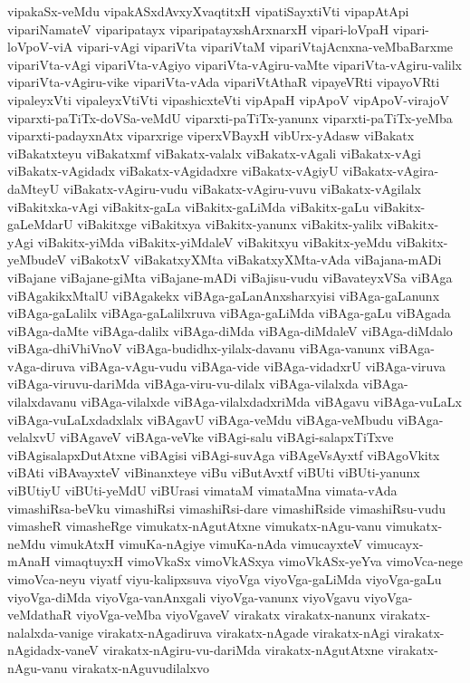 {vipakaSx-veMdu
vipakASxdAvxyXvaqtitxH
vipatiSayxtiVti
vipapAtApi
vipariNamateV
viparipatayx
viparipatayxshArxnarxH
vipari-loVpaH
vipari-loVpoV-viA
vipari-vAgi
vipariVta
vipariVtaM
vipariVtajAcnxna-veMbaBarxme
vipariVta-vAgi
vipariVta-vAgiyo
vipariVta-vAgiru-vaMte
vipariVta-vAgiru-valilx
vipariVta-vAgiru-vike
vipariVta-vAda
vipariVtAthaR
vipayeVRti
vipayoVRti
vipaleyxVti
vipaleyxVtiVti
vipashicxteVti
vipApaH
vipApoV
vipApoV-virajoV
viparxti-paTiTx-doVSa-veMdU
viparxti-paTiTx-yanunx
viparxti-paTiTx-yeMba
viparxti-padayxnAtx
viparxrige
viperxVBayxH
vibUrx-yAdasw
viBakatx
viBakatxteyu
viBakatxmf
viBakatx-valalx
viBakatx-vAgali
viBakatx-vAgi
viBakatx-vAgidadx
viBakatx-vAgidadxre
viBakatx-vAgiyU
viBakatx-vAgira-daMteyU
viBakatx-vAgiru-vudu
viBakatx-vAgiru-vuvu
viBakatx-vAgilalx
viBakitxka-vAgi
viBakitx-gaLa
viBakitx-gaLiMda
viBakitx-gaLu
viBakitx-gaLeMdarU
viBakitxge
viBakitxya
viBakitx-yanunx
viBakitx-yalilx
viBakitx-yAgi
viBakitx-yiMda
viBakitx-yiMdaleV
viBakitxyu
viBakitx-yeMdu
viBakitx-yeMbudeV
viBakotxV
viBakatxyXMta
viBakatxyXMta-vAda
viBajana-mADi
viBajane
viBajane-giMta
viBajane-mADi
viBajisu-vudu
viBavateyxVSa
viBAga
viBAgakikxMtalU
viBAgakekx
viBAga-gaLanAnxsharxyisi
viBAga-gaLanunx
viBAga-gaLalilx
viBAga-gaLalilxruva
viBAga-gaLiMda
viBAga-gaLu
viBAgada
viBAga-daMte
viBAga-dalilx
viBAga-diMda
viBAga-diMdaleV
viBAga-diMdalo
viBAga-dhiVhiVnoV
viBAga-budidhx-yilalx-davanu
viBAga-vanunx
viBAga-vAga-diruva
viBAga-vAgu-vudu
viBAga-vide
viBAga-vidadxrU
viBAga-viruva
viBAga-viruvu-dariMda
viBAga-viru-vu-dilalx
viBAga-vilalxda
viBAga-vilalxdavanu
viBAga-vilalxde
viBAga-vilalxdadxriMda
viBAgavu
viBAga-vuLaLx
viBAga-vuLaLxdadxlalx
viBAgavU
viBAga-veMdu
viBAga-veMbudu
viBAga-velalxvU
viBAgaveV
viBAga-veVke
viBAgi-salu
viBAgi-salapxTiTxve
viBAgisalapxDutAtxne
viBAgisi
viBAgi-suvAga
viBAgeVsAyxtf
viBAgoVkitx
viBAti
viBAvayxteV
viBinanxteye
viBu
viButAvxtf
viBUti
viBUti-yanunx
viBUtiyU
viBUti-yeMdU
viBUrasi
vimataM
vimataMna
vimata-vAda
vimashiRsa-beVku
vimashiRsi
vimashiRsi-dare
vimashiRside
vimashiRsu-vudu
vimasheR
vimasheRge
vimukatx-nAgutAtxne
vimukatx-nAgu-vanu
vimukatx-neMdu
vimukAtxH
vimuKa-nAgiye
vimuKa-nAda
vimucayxteV
vimucayx-mAnaH
vimaqtuyxH
vimoVkaSx
vimoVkASxya
vimoVkASx-yeYva
vimoVca-nege
vimoVca-neyu
viyatf
viyu-kalipxsuva
viyoVga
viyoVga-gaLiMda
viyoVga-gaLu
viyoVga-diMda
viyoVga-vanAnxgali
viyoVga-vanunx
viyoVgavu
viyoVga-veMdathaR
viyoVga-veMba
viyoVgaveV
virakatx
virakatx-nanunx
virakatx-nalalxda-vanige
virakatx-nAgadiruva
virakatx-nAgade
virakatx-nAgi
virakatx-nAgidadx-vaneV
virakatx-nAgiru-vu-dariMda
virakatx-nAgutAtxne
virakatx-nAgu-vanu
virakatx-nAguvudilalxvo
}
